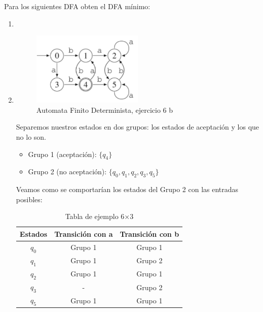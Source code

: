 \begin{Pro}
   Para los siguientes DFA obten el DFA mínimo:
\end{Pro}

\begin{enumerate}
    \item 
    \item 
    \begin{figure}[ht]
        \centering
        \includegraphics[width=0.5\textwidth]{images/ejercicio6b.png}
        \caption{Automata Finito Determinista, ejercicio 6 b}
    \end{figure}
    Separemos nuestros estados en dos grupos: los estados de aceptación y los que no lo son.
    \begin{itemize}
        \item Grupo 1 (aceptación): $\{q_4\}$
        \item Grupo 2 (no aceptación): $\{q_0, q_1, q_2, q_3, q_5\}$
    \end{itemize}

    Veamos como se comportarían los estados del Grupo 2 con las entradas posibles:
    \begin{table}[ht]
    \centering
    \begin{tabular}{|c|c|c|}
    \hline
    \textbf{Estados} & \textbf{Transición con a} & \textbf{Transición con b } \\
    \hline
    $q_0$ & Grupo 1 & Grupo 1\\
    \hline
    $q_1$ & Grupo 1 & Grupo 2 \\
    \hline
    $q_2$  & Grupo 1 & Grupo 1 \\
    \hline
    $q_3$ & - & Grupo 2 \\
    \hline
    $q_5$ & Grupo 1 & Grupo 1 \\
    \hline
    \end{tabular}
    \caption{Tabla de ejemplo 6×3}
    \label{tab:ejemplo}
    \end{table}

\end{enumerate}

